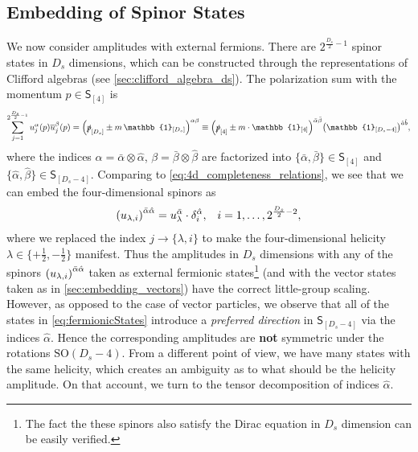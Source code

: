 \subsection{Embedding of Spinor States}
\label{sec:embedding_spinors}

We now consider amplitudes with external fermions.
There are $2^{\frac{D_s}{2}-1}$ spinor states in $D_s$ dimensions, 
which can be constructed through the representations of Clifford algebras (see \cref{sec:clifford_algebra_ds}).
The polarization sum with the momentum $p \in \mathsf{S}_{[4]}$ is
\begin{equation}
  \sum_{j=1}^{2^{\frac{D_s}{2}-1}} u^\alpha_j(p){\overline{u}_j^\beta}(p) = \qty(\slashed{p}_{[D_s]}  \pm m\,\mathbb{1}_{[D_s]})^{\alpha\beta} \equiv 
  \qty(\slashed{p}_{[4]} \pm m \cdot \mathbb{1}_{[4]})^{\bar{\alpha}\bar{\beta}} \qty(\mathbb{1}_{[D_s-4]})^{\hat{a}\hat{b}},
\end{equation}
where the indices $\alpha = \bar{\alpha}\otimes\hat{\alpha}$,  $\beta = \bar{\beta}\otimes \hat{\beta}$ are factorized into 
$\{\bar{\alpha},\bar{\beta}\}\in \mathsf{S}_{[4]}$ and $\{\hat{\alpha},\hat{\beta}\}\in \mathsf{S}_{[D_s-4]}$.
Comparing to \cref{eq:4d_completeness_relations}, we see that we can embed the four-dimensional spinors as
\begin{align} \label{eq:fermionicStates}
    \qty(u_{\lambda,i})^{\bar{\alpha}\hat{\alpha}} =  u_{\lambda}^{\bar{\alpha}} \cdot \delta_i^{\hat{\alpha}}, && i = 1,\ldots{},2^{\frac{D_s}{2}-2},
\end{align}
where we replaced the index $j \to \{\lambda, i \}$ to make the four-dimensional helicity $\lambda \in  \{+\frac{1}{2},-\frac{1}{2}\}$ manifest.
Thus the amplitudes in $D_s$ dimensions with any of the spinors $\qty(u_{\lambda,i})^{\bar{\alpha}\hat{\alpha}}$ taken as external fermionic states\footnote{
  The fact the these spinors also satisfy the Dirac equation in $D_s$ dimension can be easily verified.
}
(and with the vector states taken as in \cref{sec:embedding_vectors}) have the correct little-group scaling.
However, as opposed to the case of vector particles, we observe that 
all of the states in \cref{eq:fermionicStates} introduce a \emph{preferred direction} in  $\mathsf{S}_{[D_s-4]}$
via the indices $\hat{\alpha}$.
Hence the corresponding amplitudes are \textbf{not} symmetric under the rotations $\mathrm{SO}(D_s-4)$.
From a different point of view, we have many states with the same helicity, which creates an ambiguity as to what 
should be the helicity amplitude.
On that account, we turn to the tensor decomposition of indices $\hat{\alpha}$.

